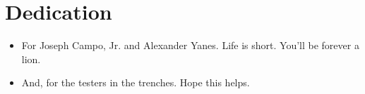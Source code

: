 \chapter*{Dedication}

\begin{itemize}
\item For Joseph Campo, Jr. and Alexander Yanes. Life is short. You'll be forever a lion.

\item And, for the testers in the trenches. Hope this helps.
\end{itemize}
